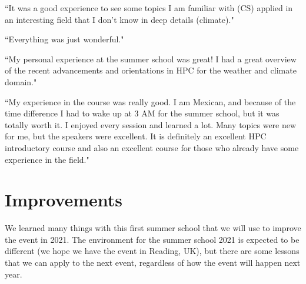 ``It was a good experience to see some topics I am familiar with (CS) applied in an interesting field that I don't know in deep details (climate)."

``Everything was just wonderful."

``My personal experience at the summer school was great! I had a great overview of the recent advancements and orientations in HPC for the weather and climate domain."

``My experience in the course was really good. I am Mexican, and because of the time difference I had to wake up at 3 AM for the summer school, but it was totally worth it. I enjoyed every session and learned a lot. Many topics were new for me, but the speakers were excellent. It is definitely an excellent HPC introductory course and also an excellent course for those who already have some experience in the field."

\section{Improvements}

We learned many things with this first summer school that we will use to improve the event in 2021. The environment for the summer school 2021 is expected to be different (we hope we have the event in Reading, UK), but there are some lessons that we can apply to the next event, regardless of how the event will happen next year.

